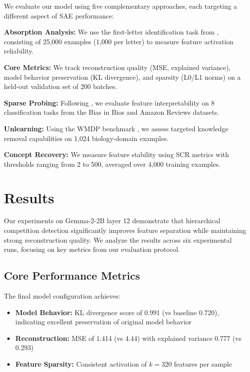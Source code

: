 \documentclass{article} %
\begin{document}
We evaluate our model using five complementary approaches, each targeting a different aspect of SAE performance:

\textbf{Absorption Analysis:} We use the first-letter identification task from \cite{chaninAbsorptionStudyingFeature2024}, consisting of 25,000 examples (1,000 per letter) to measure feature activation reliability.

\textbf{Core Metrics:} We track reconstruction quality (MSE, explained variance), model behavior preservation (KL divergence), and sparsity (L0/L1 norms) on a held-out validation set of 200 batches.

\textbf{Sparse Probing:} Following \cite{gurneeFindingNeuronsHaystack2023}, we evaluate feature interpretability on 8 classification tasks from the Bias in Bios \cite{de-arteagaBiasBiosCase2019} and Amazon Reviews \cite{hou2024bridging} datasets.

\textbf{Unlearning:} Using the WMDP benchmark \cite{farrellApplyingSparseAutoencoders2024}, we assess targeted knowledge removal capabilities on 1,024 biology-domain examples.

\textbf{Concept Recovery:} We measure feature stability using SCR metrics \cite{karvonenEvaluatingSparseAutoencoders2024} with thresholds ranging from 2 to 500, averaged over 4,000 training examples.

\section{Results}
\label{sec:results}

Our experiments on Gemma-2-2B layer 12 demonstrate that hierarchical competition detection significantly improves feature separation while maintaining strong reconstruction quality. We analyze the results across six experimental runs, focusing on key metrics from our evaluation protocol.

\subsection{Core Performance Metrics}

The final model configuration achieves:
\begin{itemize}
\item \textbf{Model Behavior:} KL divergence score of 0.991 (vs baseline 0.720), indicating excellent preservation of original model behavior
\item \textbf{Reconstruction:} MSE of 1.414 (vs 4.44) with explained variance 0.777 (vs 0.293)
\item \textbf{Feature Sparsity:} Consistent activation of $k=320$ features per sample
\end{itemize}
\end{document}
